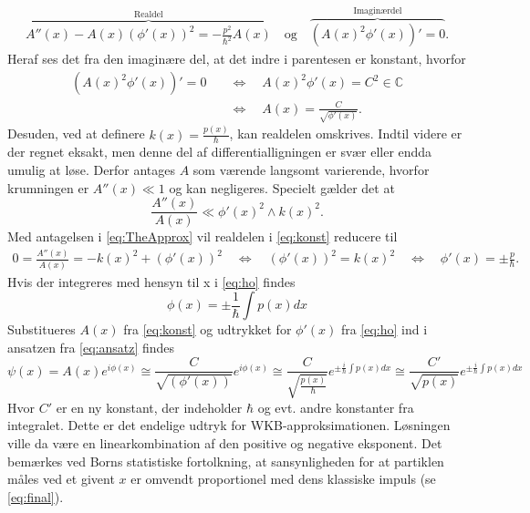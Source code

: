\begin{align}
    \overbrace{A''(x) - A(x)\left( \phi'(x) \right)^{2} = - \frac{p^{2}}{\hbar^{2}}A(x)}^{\text{Realdel}} \quad \text{og} \quad%
    \overbrace{\left( A(x)^{2}\phi'(x) \right)' = 0}^{\text{Imaginærdel}}.
    \label{eq:realogimag}
\end{align}
Heraf ses det fra den imaginære del, at det indre i parentesen er konstant, hvorfor
\begin{align}
    \left( A(x)^{2}\phi'(x) \right)' = 0  \quad & \Leftrightarrow  \quad A(x)^{2}\phi'(x) = C^{2} \in \mathbb{C} \\
    & \Leftrightarrow  \quad A(x) = \frac{C}{\sqrt{\phi'(x)}}.
    \label{eq:konst}
\end{align}
Desuden, ved at definere $k(x) = \frac{p(x)}{\hbar}$, kan realdelen omskrives. Indtil videre er der regnet eksakt, men denne del af differentialligningen er svær eller endda umulig at løse. Derfor antages $A$ som værende langsomt varierende, hvorfor krumningen er $A''(x)\ll 1$ og kan  negligeres.
Specielt gælder det at
\begin{equation}
  \frac{A''(x)}{A(x)} \ll \phi'(x)^{2}\wedge k(x)^2.
  \label{eq:TheApprox}
\end{equation}
Med antagelsen i \cref{eq:TheApprox} vil realdelen i \cref{eq:konst} reducere til
\begin{align}
    0 = \frac{A''(x)}{A(x)} = -k(x)^{2} + (\phi'(x))^{2}
    \quad \Leftrightarrow\quad  \left(\phi'(x)\right)^{2} = k(x)^{2} \quad \Leftrightarrow \quad  \phi'(x) = \pm \frac{p}{\hbar}.
    \label{eq:ho}
\end{align}
Hvis der integreres med hensyn til x i \cref{eq:ho} findes
%
\begin{equation}
    \phi(x) = \pm \frac{1}{\hbar} \int p(x) dx
    \label{eq:thisPhi}
\end{equation}
%
Substitueres $A(x)$ fra \cref{eq:konst} og udtrykket for $\phi{'\left (x \right )}$ fra \cref{eq:ho}  ind i ansatzen fra \cref{eq:ansatz} findes
\begin{equation}
    \psi(x) = A(x) e^{i \phi(x)} \cong
    \frac{C}{\sqrt{( \phi{'\left (x \right )})}} e^{i \phi(x)} \cong
    \frac{C}{\sqrt{\frac{p(x)}{\hbar}}} e^{\pm \frac{i}{\hbar} \int p(x) dx} \cong
    \frac{C'}{\sqrt{p(x)}} e^{\pm \frac{i}{\hbar} \int p(x) dx}
    \label{eq:final}
\end{equation}
%
Hvor $C'$ er en ny konstant, der indeholder $\hbar$ og evt. andre konstanter fra integralet. Dette er det endelige udtryk for WKB-approksimationen. Løsningen ville da være en linearkombination af den positive og negative eksponent. Det bemærkes ved Borns statistiske fortolkning, at sansynligheden for at partiklen måles ved et givent $x$ er omvendt proportionel med dens klassiske impuls (se \cref{eq:final}).
